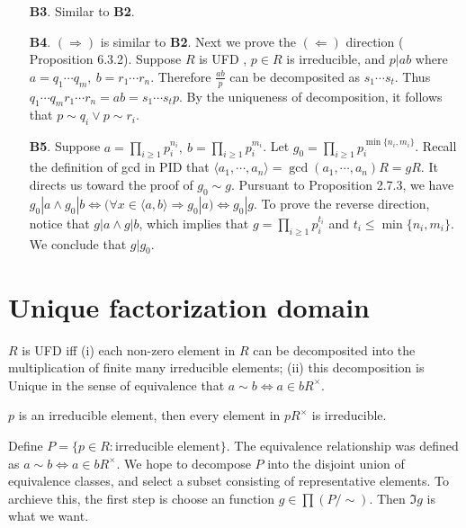 \begin{enumerate}
    
    \item[\textbf{B3}.] Similar to \textbf{B2}.
    \item[\textbf{B4}.] $(\Rightarrow)$ is similar to  \textbf{B2}. Next we prove the $(\Leftarrow)$ direction (\cite{LWW_AJN} Proposition 6.3.2). Suppose $R$ is UFD , $p \in R$ is irreducible, and $p | ab$ where $a = q_1 \cdots q_m, \ b = r_1\cdots r_n$. Therefore $\frac{ab}{p}$ can be decomposited as $s_1 \cdots s_t$. Thus $q_1 \cdots q_m r_1\cdots r_n = ab = s_1 \cdots s_t p$. By the uniqueness of decomposition, it follows that $p \sim q_i \lor p \sim r_i$. 
    \item[\textbf{B5}.] Suppose $a = \prod_{i \geq 1} p_i^{n_i}, \ b = \prod_{i\geq 1} p_i^{m_i}$. Let $g_0 = \prod_{i \geq 1} p_i^{\min\{ n_i, m_i \}}$. Recall the definition of gcd in PID that $\langle a_1 , \cdots, a_n \rangle = \gcd(a_1, \cdots, a_n) R = gR$. It directs us toward the proof of $g_0 \sim g$. Pursuant to \cite{LWW_AJN} Proposition 2.7.3, we have $g_0|a \land g_0 | b \Leftrightarrow (\forall x \in \langle a, b \rangle \Rightarrow g_0 | a ) \Leftrightarrow g_0 | g$. To prove the reverse direction, notice that $g | a \land g | b$, which implies that $g = \prod_{i\geq 1} p_i^{t_i}$ and $t_i \leq \min\{ n_i, m_i \}$. We conclude that $g | g_0$.
\end{enumerate}



\section{Unique factorization domain}
\begin{definition}
    $R$ is UFD iff (i) each non-zero element in $R$ can be decomposited into the multiplication of finite many irreducible elements; (ii) this decomposition is Unique in the sense of equivalence that $a \sim b \Leftrightarrow a \in bR^{\times}$.
\end{definition}


\begin{corollary}
    $p$ is an irreducible element, then every element in $p R^{\times}$ is irreducible.
\end{corollary}


Define $P = \{ p \in R: \text{irreducible element} \}$. The equivalence relationship was defined as $a \sim b \Leftrightarrow a \in b R^{\times}$. We hope to decompose $P$ into the disjoint union of equivalence classes, and select a subset consisting of representative elements. To archieve this, the first step is choose an function $g \in \prod (P / \sim)$. Then $\Im g$ is what we want.


